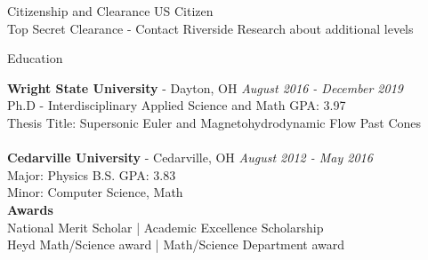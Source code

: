 \documentclass{resume} %
\begin{document}
\begin{rSection}{Citizenship and Clearance}
US Citizen
\\Top Secret Clearance - Contact Riverside Research about additional levels

\end{rSection}


\begin{rSection}{Education}

{\bf Wright State University} - Dayton, OH \hfill {\em August 2016 - December 2019} 
\\ Ph.D - Interdisciplinary Applied Science and Math \hfill {GPA: 3.97}
\\ Thesis Title: Supersonic Euler and Magnetohydrodynamic Flow Past Cones\\
\\{\bf Cedarville University} - Cedarville, OH \hfill {\em August 2012 - May 2016} 
\\ Major: Physics B.S. \hfill { GPA: 3.83 }
\\ Minor: Computer Science, Math \smallskip \\
{\bf Awards} \\ National Merit Scholar | Academic Excellence Scholarship \\ Heyd Math/Science award | Math/Science Department award



\end{rSection}
\end{document}
